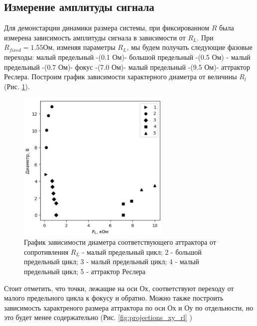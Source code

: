 \documentclass[12pt]{article}
\begin{document}
\subsection*{Измерение амплитуды сигнала }
Для демонстарции динамики размера системы, при фиксированном $R$ была измерена зависимость 
амплитуды сигнала в зависимости от $R_L$.  
При $R_{fixed} = 1.55 \text{Ом}$, изменяя параметры $R_L$, мы будем получать следующие фазовые переходы: малый предельный -(0.1 Ом)- большой предельный -(0.5 Ом) - малый предельный -(0.7 Ом)- фокус -(7.0 Ом)- малый предельный -(9.5 Ом)- аттрактор Реслера.
Построим график зависимости характерного диаметра от величины $R_l$ (Рис. \ref{fig:amplitudes_fix_R}).
\begin{figure}[H]
	\centering
	\includegraphics[width=0.65\textwidth]{diam(rl).png}
	\caption{График зависимости диаметра соответствующего аттрактора от сопротивления $R_L$  - малый предельный цикл; 2 - большой предельный цикл; 3 - малый предельный цикл; 4 - малый предельный цикл; 5 - аттрактор Реслера}
	\label{fig:amplitudes_fix_R}
\end{figure}
Стоит отметить, что точки, лежащие на оси Ох, соответствуют переходу от малого предельного цикла к фокусу и обратно. Можно также построить зависимость характреного размера аттрактора по оси Ох и Оу по отдельности, но это будет менее содержательно (Рис. \ref{fig:projections_xy_rl} )
\end{document}
